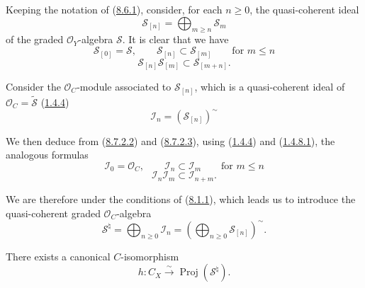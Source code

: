 \begin{env}[8.7.2]
\label{II.8.7.2}
Keeping the notation of (\hyperref[II.8.6.1]{8.6.1}), consider, for each
$n\geqslant 0$, the quasi-coherent ideal
\begin{equation}
\label{II.8.7.2.1}
  \mathcal{S}_{[n]}=\bigoplus_{m\geqslant n}\mathcal{S}_m
\tag{8.7.2.1}
\end{equation}
of the graded $\mathcal{O}_Y$-algebra $\mathcal{S}$. It is clear that we have
\begin{equation}
\label{II.8.7.2.2}
  \mathcal{S}_{[0]}=\mathcal{S},\qquad
  \mathcal{S}_{[n]}\subset\mathcal{S}_{[m]}
  \qquad\text{for }m\leqslant n
\tag{8.7.2.2}
\end{equation}
\begin{equation}
\label{II.8.7.2.3}
  \mathcal{S}_{[n]}\mathcal{S}_{[m]}\subset\mathcal{S}_{[m+n]}.
\tag{8.7.2.3}
\end{equation}

Consider the $\mathcal{O}_C$-module associated to $\mathcal{S}_{[n]}$, which is
a quasi-coherent ideal of $\mathcal{O}_C=\widetilde{\mathcal{S}}$
(\hyperref[II.1.4.4]{1.4.4})
\begin{equation}
\label{II.8.7.2.4}
  \mathcal{I}_n=(\mathcal{S}_{[n]})^{\sim}
\tag{8.7.2.4}
\end{equation}

We then deduce from (\hyperref[II.8.7.2.2]{8.7.2.2}) and
(\hyperref[II.8.7.2.3]{8.7.2.3}), using
(\hyperref[II.1.4.4]{1.4.4}) and (\hyperref[II.1.4.8.1]{1.4.8.1}),
the analogous formulas
\begin{equation}
\label{II.8.7.2.5}
  \mathcal{I}_0=\mathcal{O}_C,\qquad
  \mathcal{I}_n\subset\mathcal{I}_m
  \qquad\text{for }m\leqslant n
\tag{8.7.2.5}
\end{equation}
\begin{equation}
\label{II.8.7.2.6}
  \mathcal{I}_n\mathcal{I}_m\subset\mathcal{I}_{n+m}.
\tag{8.7.2.6}
\end{equation}

We are therefore under the conditions of (\hyperref[II.8.1.1]{8.1.1}),
which leads us to introduce the quasi-coherent graded $\mathcal{O}_C$-algebra
\begin{equation}
\label{II.8.7.2.7}
  \mathcal{S}^{\natural}
  =\bigoplus_{n\geqslant 0}\mathcal{I}_n
  =\left(\bigoplus_{n\geqslant 0}\mathcal{S}_{[n]}\right)^{\sim}.
\tag{8.7.2.7}
\end{equation}
\end{env}

\begin{proposition}[8.7.3]
\label{II.8.7.3}
There exists a canonical $C$-isomorphism
\begin{equation}
\label{II.8.7.3.1}
  h:C_X\xrightarrow{\sim}\operatorname{Proj}(\mathcal{S}^{\natural}).
\tag{8.7.3.1}
\end{equation}
\end{proposition}

